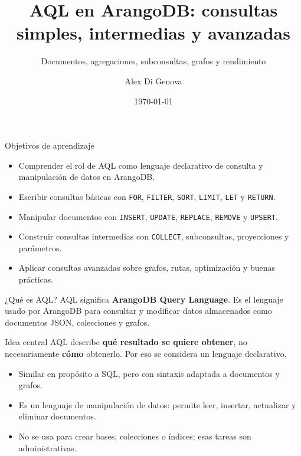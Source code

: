 \documentclass[aspectratio=169,11pt]{beamer}
\title[Clase AQL]{AQL en ArangoDB: consultas simples, intermedias y avanzadas}
\subtitle{Documentos, agregaciones, subconsultas, grafos y rendimiento}
\author{Alex Di Genova}
\institute{Curso de Bases de Datos / Minería de Datos}
\date{\today}
\begin{document}
\begin{frame}
  \titlepage
\end{frame}

\begin{frame}{Objetivos de aprendizaje}
\begin{itemize}
  \item Comprender el rol de AQL como lenguaje declarativo de consulta y manipulación de datos en ArangoDB.
  \item Escribir consultas básicas con \texttt{FOR}, \texttt{FILTER}, \texttt{SORT}, \texttt{LIMIT}, \texttt{LET} y \texttt{RETURN}.
  \item Manipular documentos con \texttt{INSERT}, \texttt{UPDATE}, \texttt{REPLACE}, \texttt{REMOVE} y \texttt{UPSERT}.
  \item Construir consultas intermedias con \texttt{COLLECT}, subconsultas, proyecciones y parámetros.
  \item Aplicar consultas avanzadas sobre grafos, rutas, optimización y buenas prácticas.
\end{itemize}
\end{frame}

\begin{frame}{¿Qué es AQL?}
\justifying
AQL significa \textbf{ArangoDB Query Language}. Es el lenguaje usado por ArangoDB para consultar y modificar datos almacenados como documentos JSON, colecciones y grafos.

\vspace{0.4cm}
\begin{block}{Idea central}
AQL describe \textbf{qué resultado se quiere obtener}, no necesariamente \textbf{cómo} obtenerlo. Por eso se considera un lenguaje declarativo.
\end{block}

\vspace{0.2cm}
\begin{itemize}
  \item Similar en propósito a SQL, pero con sintaxis adaptada a documentos y grafos.
  \item Es un lenguaje de manipulación de datos: permite leer, insertar, actualizar y eliminar documentos.
  \item No se usa para crear bases, colecciones o índices; esas tareas son administrativas.
\end{itemize}
\end{frame}
\end{document}
